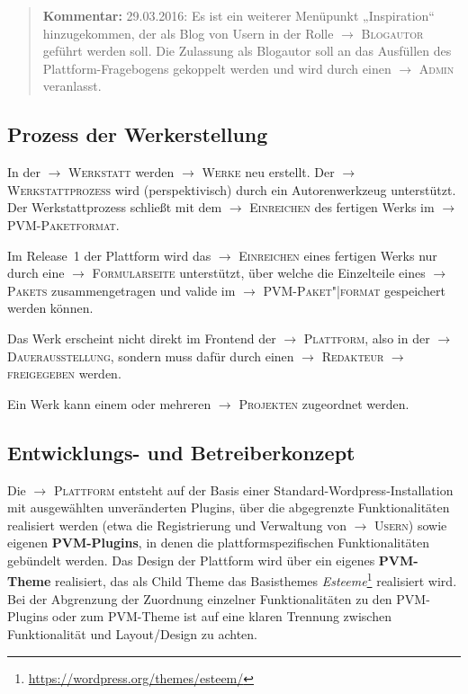 \documentclass[a4paper,11pt]{article}
\newcommand{\Kommentar}[1]{
  \begin{quote}\textbf{Kommentar:} #1 \end{quote}
}
\newcommand{\glossar}[1]{{$\to$ \textsc{#1}}}
\begin{document}
\Kommentar{29.03.2016: Es ist ein weiterer Menüpunkt „Inspiration“
  hinzugekommen, der als Blog von Usern in der Rolle \glossar{Blogautor}
  geführt werden soll. Die Zulassung als Blogautor soll an das Ausfüllen des
  Plattform-Fragebogens gekoppelt werden und wird durch einen \glossar{Admin}
  veranlasst. }

\subsection{Prozess der Werkerstellung}\label{grundlagen.werkerstellung}

In der \glossar{Werkstatt} werden \glossar{Werke} neu erstellt. Der
\glossar{Werkstattprozess} wird (perspektivisch) durch ein Autorenwerkzeug
unterstützt.  Der Werkstattprozess schließt mit dem \glossar{Einreichen} des
fertigen Werks im \glossar{PVM-Paketformat}.

Im Release~1 der Plattform wird das \glossar{Einreichen} eines fertigen Werks
nur durch eine \glossar{Formularseite} unterstützt, über welche die Einzelteile
eines \glossar{Pakets} zusammengetragen und valide im
\glossar{PVM-Paket"|format} gespeichert werden können.

Das Werk erscheint nicht direkt im Frontend der \glossar{Plattform}, also in
der \glossar{Dauerausstellung}, sondern muss dafür durch einen
\glossar{Redakteur} \glossar{freigegeben} werden.

Ein Werk kann einem oder mehreren \glossar{Projekten} zugeordnet werden.

\subsection{Entwicklungs- und Betreiberkonzept}
\label{grundlagen.betreiberkonzept}

Die \glossar{Plattform} entsteht auf der Basis einer
Standard-Wordpress-Installation mit ausgewählten unveränderten Plugins, über
die abgegrenzte Funktionalitäten realisiert werden (etwa die Registrierung und
Verwaltung von \glossar{Usern}) sowie eigenen \textbf{PVM-Plugins}, in denen
die plattformspezifischen Funktionalitäten gebündelt werden.  Das Design der
Plattform wird über ein eigenes \textbf{PVM-Theme} realisiert, das als Child
Theme das Basisthemes
\emph{Esteeme}\footnote{\url{https://wordpress.org/themes/esteem/}} realisiert
wird.  Bei der Abgrenzung der Zuordnung einzelner Funktionalitäten zu den
PVM-Plugins oder zum PVM-Theme ist auf eine klaren Trennung zwischen
Funktionalität und Layout/Design zu achten.
\end{document}
